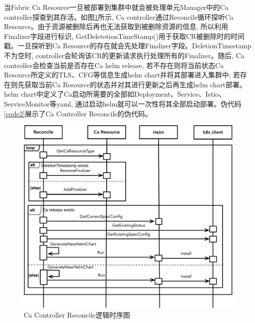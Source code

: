 当Fabric Ca Resource一旦被部署到集群中就会被处理单元Manager中的Ca  controller探查到其存活。如图\ref{reconcile}所示, Ca controller通过Reconcile循环探听Ca Resource。由于资源被删除后再也无法获取到被删除资源的信息, 所以利用Finalizer字段进行标识, GetDeletetionTimeStamp()用于获取CR被删除时的时间戳。一旦探听到Ca Resource的存在就会先处理Finalizer字段。DeletionTimestamp不为空时, controller会轮询该CR的更新请求执行处理所有的Finalizer。随后, Ca controller会检查当前是否存在Ca helm release, 若不存在则将当前状态Ca Resource所定义的TLS、CFG等信息生成helm chart并将其部署进入集群中; 若存在则先获取当前Ca Resource的状态并对其进行更新之后再生成helm chart部署。helm chart中定义了Ca启动所需要的全部如Deployment、Service、Istio、ServiceMonitor等yaml, 通过启动helm就可以一次性将其全部启动部署。伪代码\ref{code2}展示了Ca Controller Reconcile的伪代码。


\begin{figure}[!htbp] %
    \centering %
    \includegraphics[width=1.0\textwidth]{FIGs/chapter4/reconcile.pdf} %
    \caption{Ca Controller Reconcile逻辑时序图} %
    \label{reconcile} %
\end{figure}%


